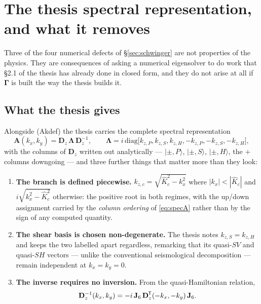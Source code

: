 \documentclass[11pt,a4paper]{article}
\newcommand{\bA}{\mathbf{A}}
\newcommand{\Jsix}{\mathbf{J}_{6}}
\newcommand{\tp}{^{\mkern-1.5mu\mathsf{T}}}
\begin{document}
\section{The thesis spectral representation, and what it
removes}\label{sec:thesisspectral}

Three of the four numerical defects of \S\ref{sec:schwinger} are not properties
of the physics.  They are consequences of asking a numerical eigensolver to do
work that \S2.1 of the thesis has already done in closed form, and they do not
arise at all if $\boldsymbol\Gamma$ is built the way the thesis builds it.

\subsection{What the thesis gives}

Alongside (Akdef) the thesis carries the complete spectral
representation
\begin{equation}\label{eq:specA}
  \bA(k_x,k_y) = \mathbf{D}_z\,\boldsymbol\Lambda\,\mathbf{D}_z^{-1},
  \qquad
  \boldsymbol\Lambda = i\,\mathrm{diag}\bigl[k_{z,P},k_{z,S},k_{z,H},
                                            -k_{z,P},-k_{z,S},-k_{z,H}\bigr],
\end{equation}
with the columns of $\mathbf{D}_z$ written out analytically --- $|\pm,P\rangle$,
$|\pm,S\rangle$, $|\pm,H\rangle$, the $+$ columns downgoing --- and three
further things that matter more than they look:

\begin{enumerate}
\item \textbf{The branch is defined piecewise.}
      $k_{z,c} = \sqrt{\hat K_c^2-k_x^2}$ where $|k_x|<|\hat K_c|$ and
      $i\sqrt{k_x^2-\hat K_c^2}$ otherwise: the positive root in both regimes,
      with the up/down assignment carried by the \emph{column ordering} of
      \eqref{eq:specA} rather than by the sign of any computed quantity.
\item \textbf{The shear basis is chosen non-degenerate.}  The thesis notes
      $k_{z,S} = k_{z,H}$ and keeps the two labelled apart regardless, remarking
      that its quasi-$SV$ and quasi-$SH$ vectors --- unlike the conventional
      seismological decomposition --- remain independent at $k_x=k_y=0$.
\item \textbf{The inverse requires no inversion.}  From the quasi-Hamiltonian
      relation,
      \begin{equation}\label{eq:dzinv}
        \mathbf{D}_z^{-1}(k_x,k_y)
          = -i\,\Jsix\,\mathbf{D}_z\tp(-k_x,-k_y)\,\Jsix .
      \end{equation}
\end{enumerate}
\end{document}
